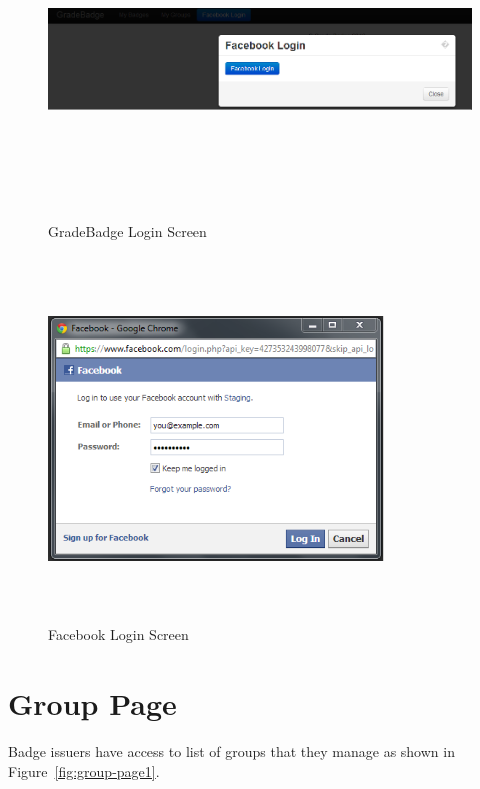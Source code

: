 \vspace{3em}
\begin{figure}[H]
\begin{center}
\includegraphics[height=3.3in,width=5.5in]{images/facebook-login.jpg}
\caption{GradeBadge Login Screen}
\label{fig:login_screen}
\end{center}
\end{figure}

\vspace{3em}
\begin{figure}[H]
\begin{center}
\includegraphics[height=3.8in,width=3.5in]{images/facebook-login1.jpg}
\caption{Facebook Login Screen}
\label{fig:fb_login_screen}
\end{center}
\end{figure}

\newpage
\section{Group Page}
 Badge issuers have access to list of groups that they manage as shown in Figure~\ref{fig:group-page1}. 

